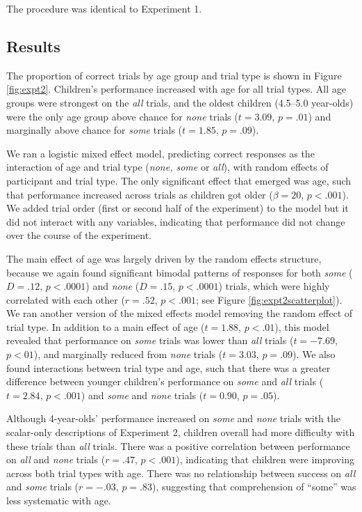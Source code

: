 \documentclass[10pt,letterpaper]{article}
\begin{document}
The procedure was identical to Experiment 1. 

\subsection{Results}

The proportion of correct trials by age group and trial type is shown in Figure \ref{fig:expt2}.  Children's performance increased with age for all trial types. All age groups were strongest on the \emph{all} trials, and the oldest children (4.5--5.0 year-olds) were the only age group above chance for \emph{none} trials ($t = 3.09$, $p=.01$) and marginally above chance for \emph{some} trials ($t=1.85$, $p=.09$). 

We ran a logistic mixed effect model, predicting correct responses as the interaction of age and trial type (\emph{none, some} or \emph{all}), with random effects of participant and trial type. The only significant effect that emerged was age, such that performance increased across trials as children got older ($\beta = 20$, $p <.001$). We added trial order (first or second half of the experiment) to the model but it did not interact with any variables, indicating that performance did not change over the course of the experiment.

The main effect of age was largely driven by the random effects structure, because we again found significant bimodal patterns of responses for both \emph{some} ($D=.12$, $p<.0001$) and \emph{none} ($D=.15$, $p<.0001$) trials, which were highly correlated with each other ($r=.52$, $p<.001$; see Figure \ref{fig:expt2scatterplot}). We ran another version of the mixed effects model removing the random effect of trial type. In addition to a main effect of age ($t = 1.88$, $p<.01$), this model revealed that performance on \emph{some} trials was lower than \emph{all} trials ($t = -7.69$, $p<01$), and marginally reduced from \emph{none} trials ($t = 3.03$, $p=.09$). We also found interactions between trial type and age, such that there was a greater difference between younger children's performance on \emph{some} and \emph{all} trials ($t=2.84$, $p<.001$) and \emph{some} and \emph{none} trials ($t=0.90$, $p=.05$).

Although 4-year-olds' performance increased on \emph{some} and \emph{none} trials with the scalar-only descriptions of Experiment 2, children overall had more difficulty with these trials than \emph{all} trials. There was a positive correlation between performance on \emph{all} and \emph{none} trials ($r=.47$, $p<.001$), indicating that children were  improving across both trial types with age.  There was no relationship between success on \emph{all} and \emph{some} trials ($r=-.03$, $p=.83$), suggesting that comprehension of ``some'' was less systematic with age. 
\end{document}
